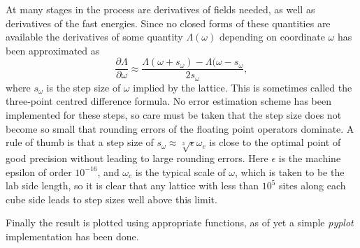 \documentclass[main.tex]{subfiles}
\begin{document}
At many stages in the process are derivatives of fields needed, as well as derivatives of
the fast energies. Since no closed forms of these quantities are available the derivatives
of some quantity \(\Lambda (\omega)\) depending on coordinate \(\omega\) has been
approximated as \[
\frac{\partial \Lambda}{\partial \omega} \approx \frac{\Lambda(\omega + s_\omega) -
\Lambda(\omega - s_\omega}{2s_\omega}
,\] 
where \(s_\omega\) is the step size of \(\omega\) implied by the lattice.
This is sometimes called the three-point centred difference formula. No error estimation scheme
has been implemented for these steps, so care must be taken that the step size does not
become so small that rounding errors of the floating point operators dominate.
A rule of thumb is that a step size of \(s_\omega \approx \sqrt[3]{\epsilon}\omega_c\) is
close to the optimal point of good precision without leading to large rounding
errors\cite{numerical}. Here \(\epsilon\) is the machine
epsilon of order \(10^{-16}\), and \(\omega_c\) is the typical scale of \(\omega\), which
is taken to be the lab side length, so it is clear that any lattice with less than \(10^5\) sites
along each cube side leads to step sizes well above this limit.

Finally the result is plotted using appropriate functions, as of yet a simple
\textit{pyplot} implementation has been done.
\end{document}
